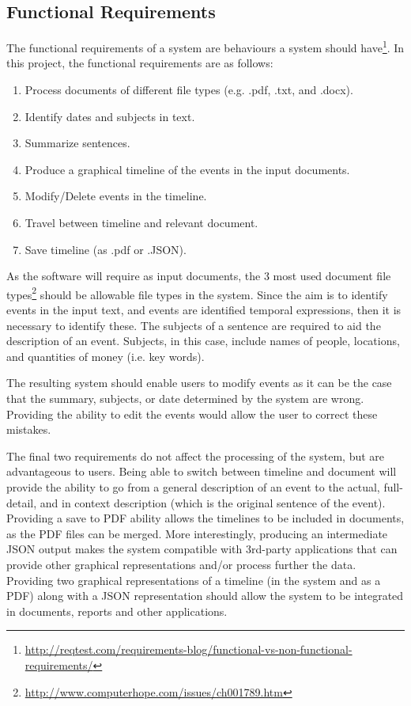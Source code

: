 \subsection{Functional Requirements}
\par The functional requirements of a system are behaviours a system should have\footnote{\url{http://reqtest.com/requirements-blog/functional-vs-non-functional-requirements/}}. In this project, the functional requirements are as follows:
\begin{enumerate}
\item Process documents of different file types (e.g. .pdf, .txt, and .docx).
\item Identify dates and subjects in text.
\item Summarize sentences.
\item Produce a graphical timeline of the events in the input documents.
\item Modify/Delete events in the timeline.
\item Travel between timeline and relevant document.
\item Save timeline (as .pdf or .JSON).
\end{enumerate} 
\par As the software will require as input documents, the 3 most used document file types\footnote{\url{http://www.computerhope.com/issues/ch001789.htm}} should be allowable file types in the system. Since the aim is to identify events in the input text, and events are identified temporal expressions, then it is necessary to identify these. The subjects of a sentence are required to  aid the description of an event. Subjects, in this case, include names of people, locations, and quantities of money (i.e. key words).
\par The resulting system should enable users to modify events as it can be the case that the summary, subjects, or date determined by the system are wrong. Providing the ability to edit the events would allow the user to correct these mistakes. 
\par The final two requirements do not affect the processing of the system, but are advantageous to users. Being able to switch between timeline and document will provide the ability to go from a general description of an event to the actual, full-detail, and in context description (which is the original sentence of the event). Providing a save to PDF ability allows the timelines to be included in documents, as the PDF files can be merged. More interestingly, producing an intermediate JSON output makes the system compatible with 3rd-party applications that can provide other graphical representations and/or process further the data. Providing two graphical representations of a timeline (in the system and as a PDF) along with a JSON representation should allow the system to be integrated in documents, reports and other applications.

